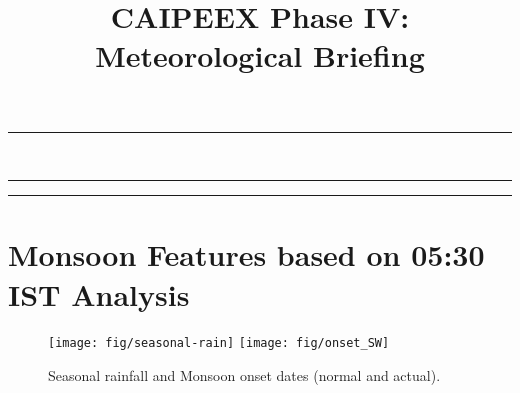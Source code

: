 \documentclass[12pt,a4paper]{article} %
\title{CAIPEEX Phase IV: Meteorological Briefing}%
\newcommand{\HorRule}[1]{\noindent\rule{\linewidth}{#1}} %
\newcommand{\SepRule}{\noindent	%
\begin{center}
\rule{250pt}{1pt} %
\end{center}
}
\begin{document}
\maketitle

\noindent\HorRule{3pt} \\[-0.75\baselineskip] %
\HorRule{1pt} %




%


\begin{multicols}{3} %
\tableofcontents
\SepRule %
\vspace{0.3cm}




\vfill
\section{Monsoon Features based on 05:30 IST Analysis}

\begin{itemize}

\end{itemize}

\end{multicols}

\begin{figure}[H]
\centering
\texttt{[image: fig/seasonal-rain]}
\texttt{[image: fig/onset\_SW]}
\caption{Seasonal rainfall and Monsoon onset dates (normal and actual).}
\end{figure}
\end{document}
